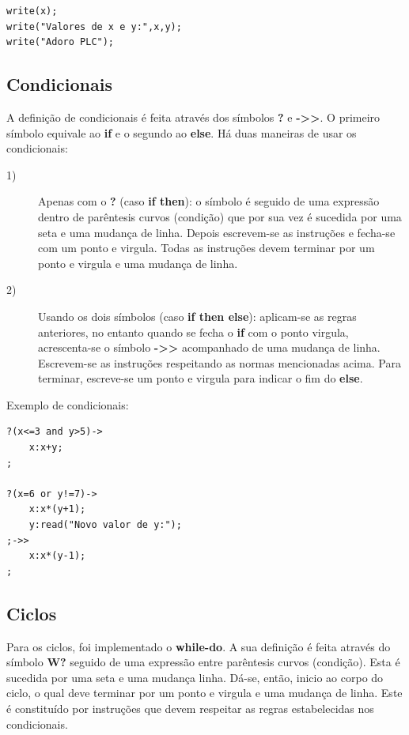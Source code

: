 \documentclass{article}
\begin{document}
\begin{lstlisting}[firstnumber=0]
write(x);
write("Valores de x e y:",x,y);
write("Adoro PLC");
\end{lstlisting}


\subsection{Condicionais}
\setlength{\parindent}{5ex} A definição de condicionais é feita através dos símbolos \textbf{?} e \textbf{-\textgreater\textgreater}. O primeiro símbolo equivale ao \textbf{if} e o segundo ao \textbf{else}. Há duas maneiras de usar os condicionais:

\begin{description}
\item[1)] Apenas com o \textbf{?} (caso \textbf{if then}): o símbolo é seguido de uma expressão dentro de parêntesis curvos (condição) que por sua vez é sucedida por uma seta e uma mudança de linha. Depois escrevem-se as instruções e fecha-se com um ponto e virgula. Todas as instruções devem terminar por um ponto e virgula e uma mudança de linha.
\item[2)] Usando os dois símbolos (caso \textbf{if then else}): aplicam-se as regras anteriores, no entanto quando se fecha o \textbf{if} com o ponto virgula, acrescenta-se o símbolo \textbf{-\textgreater\textgreater} acompanhado de uma mudança de linha. Escrevem-se as instruções respeitando as normas mencionadas acima. Para terminar, escreve-se um ponto e virgula para indicar o fim do \textbf{else}.
\end{description}

Exemplo de condicionais:
\begin{lstlisting}[firstnumber=0]
?(x<=3 and y>5)->
    x:x+y;
;

?(x=6 or y!=7)->
    x:x*(y+1);
    y:read("Novo valor de y:");
;->>
    x:x*(y-1);
;
\end{lstlisting}


\subsection{Ciclos}
\setlength{\parindent}{5ex} Para os ciclos, foi implementado o \textbf{while-do}. A sua definição é feita através do símbolo \textbf{W?} seguido de uma expressão entre parêntesis curvos (condição). Esta é sucedida por uma seta e uma mudança linha. Dá-se, então, inicio ao corpo do ciclo, o qual deve terminar por um ponto e virgula e uma mudança de linha. Este é constituído por instruções que devem respeitar as regras estabelecidas nos condicionais.
\end{document}
